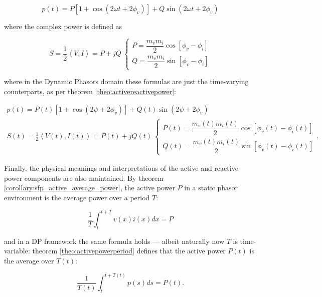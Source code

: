 \begin{equation} p(t) = P \left[1 + \cos\left(2\omega t + 2\phi_v\right) \right] + Q\sin\left(2\omega t + 2\phi_v\right)\end{equation}

	\noindent where the complex power is defined as

\begin{equation} S = \frac{1}{2}\left<V,I\right> = P + jQ\ \left\{\begin{array}{l} P = \dfrac{m_vm_i}{2}\cos\left[\phi_v - \phi_i\right] \\[3mm] Q = \dfrac{m_vm_i}{2}\sin\left[\phi_v - \phi_i\right] \end{array}\right. \end{equation}

	\noindent where in the Dynamic Phasors domain these formulas are just the time-varying counterparts, as per theorem \ref{theo:activereactivepower}:

\begin{gather}
	p(t) = P(t) \left[1 + \cos\left(2\psi + 2\phi_v\right) \right] + Q(t) \sin\left(2\psi + 2\phi_v\right) \\[3mm]
	S(t) = \frac{1}{2}\left<V(t),I(t)\right> = P(t) + jQ(t)\ \left\{\begin{array}{l} P(t) = \dfrac{m_v(t)m_i(t)}{2}\cos\left[\phi_v(t) - \phi_i(t)\right] \\[3mm] Q(t) = \dfrac{m_v(t)m_i(t)}{2}\sin\left[\phi_v(t) - \phi_i(t)\right] \end{array}\right. .
\end{gather}

	Finally, the physical meanings and interpretations of the active and reactive power components are also maintained. By theorem \ref{corollary:sfp_active_average_power}, the active power $P$ in a static phasor environment is the average power over a period $T$:

\begin{equation} \dfrac{1}{T} \int_{t}^{t + T} v(x)i(x)dx = P \end{equation}

	\noindent and in a DP framework the same formula holds — albeit naturally now $T$ is time-variable: theorem \ref{theo:activepowerperiod} defines that the active power $P(t)$ is the average over $T(t)$:

\begin{equation} \dfrac{1}{T(t)}\int_{t}^{t+T(t)} p(s)ds = P(t) .\end{equation}

